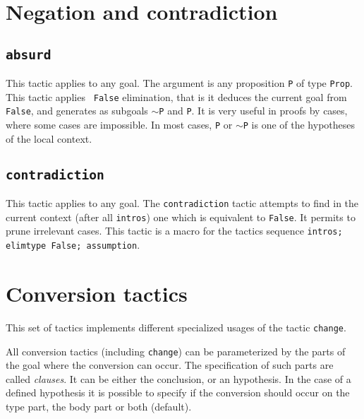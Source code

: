 \section{Negation and contradiction}

\subsection{\tt absurd \term
{}
\label{absurd}}

This tactic applies to any goal. The argument {\term} is any
proposition {\tt P} of type {\tt Prop}. This tactic applies {\tt
  False} elimination, that is it deduces the current goal from {\tt
  False}, and generates as subgoals {\tt $\sim$P} and {\tt P}. It is
very useful in proofs by cases, where some cases are impossible. In
most cases, \texttt{P} or $\sim$\texttt{P} is one of the hypotheses of
the local context.

\subsection{\tt contradiction
\label{contradiction}
}

This tactic applies to any goal. The {\tt contradiction} tactic
attempts to find in the current context (after all {\tt intros}) one
which is equivalent to {\tt False}. It permits to prune irrelevant
cases.  This tactic is a macro for the tactics sequence {\tt intros;
  elimtype False; assumption}.

\begin{ErrMsgs}
\item {}
\end{ErrMsgs}


\section{Conversion tactics
\label{Conversion-tactics}}

This set of tactics implements different specialized usages of the
tactic \texttt{change}.

All conversion tactics (including \texttt{change}) can be
parameterized by the parts of the goal where the conversion can
occur. The specification of such parts are called \emph{clauses}. It
can be either the conclusion, or an hypothesis. In the case of a
defined hypothesis it is possible to specify if the conversion should
occur on the type part, the body part or both (default).

